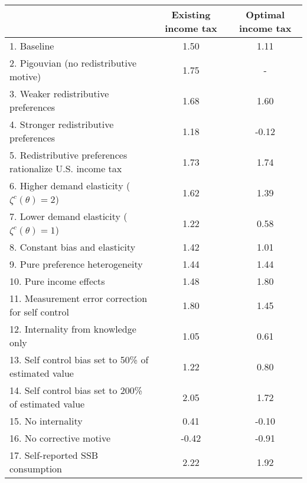 \begin{tabular}{lcc}
\hline
\hline
 & Existing income tax & Optimal income tax \\
\hline
1. Baseline & 1.50 & 1.11 \\
2. Pigouvian (no redistributive motive) & 1.75 & - \\
3. Weaker redistributive preferences & 1.68 & 1.60 \\
4. Stronger redistributive preferences & 1.18 & -0.12 \\
5. Redistributive preferences rationalize U.S. income tax & 1.73 & 1.74 \\
6. Higher demand elasticity ($\zeta^c(\theta) = 2$) & 1.62 & 1.39 \\
7. Lower demand elasticity ($\zeta^c(\theta) = 1$) & 1.22 & 0.58 \\
8. Constant bias and elasticity & 1.42 & 1.01 \\
9. Pure preference heterogeneity & 1.44 & 1.44 \\
10. Pure income effects & 1.48 & 1.80 \\
11. Measurement error correction for self control & 1.80 & 1.45 \\
12. Internality from knowledge only & 1.05 & 0.61 \\
13. Self control bias set to 50\% of estimated value & 1.22 & 0.80 \\
14. Self control bias set to 200\% of estimated value & 2.05 & 1.72 \\
15. No internality & 0.41 & -0.10 \\
16. No corrective motive & -0.42 & -0.91 \\
17. Self-reported SSB consumption & 2.22 & 1.92 \\
\hline
\hline
\end{tabular}
